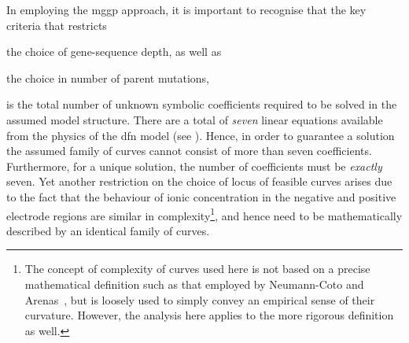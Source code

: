 In employing the \gls{mggp} approach, it  is important to recognise that the key
criteria that restricts
\begin{enumerate*}[label=\emph{\alph*})]
    \item the choice of  gene-sequence depth, as well as
    \item the choice in number of parent mutations,
\end{enumerate*}
is  the   total  number  of   unknown  symbolic  coefficients  required   to  be
solved  in the  assumed  model  structure. There  are  a  total of  \emph{seven}
linear   equations  available   from  the   physics  of   the  \gls{dfn}   model
(see ). Hence, in order to
guarantee  a solution  the  assumed  family of  curves  cannot  consist of  more
than  seven coefficients.  Furthermore, for  a  unique solution,  the number  of
coefficients must be \emph{exactly} seven. Yet another restriction on the choice
of locus of feasible  curves arises due to the fact that  the behaviour of ionic
concentration  in the  negative and  positive electrode  regions are  similar in
complexity\footnote{\label{fn:complexity}The  concept  of complexity  of  curves
used  here is  not  based on  a  precise mathematical  definition  such as  that
employed by Neumann-Coto and Arenas~\cite{Neumann-Coto2017}, but is loosely used
to simply  convey an empirical sense  of their curvature. However,  the analysis
here applies  to the more  rigorous definition as well.},  and hence need  to be
mathematically described by an identical family of curves.

